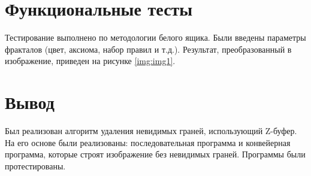 \section{Функциональные тесты}

Тестирование выполнено по методологии белого ящика. Были введены параметры фракталов (цвет, аксиома, набор правил и т.д.). Результат, преобразованный в изображение, приведен на рисунке \ref{img:img1}.

\newpage
{}

\section*{Вывод}

Был реализован алгоритм удаления невидимых граней, использующий Z-буфер. На его основе были реализованы: последовательная программа и конвейерная программа, которые строят изображение без невидимых граней. Программы были протестированы.
